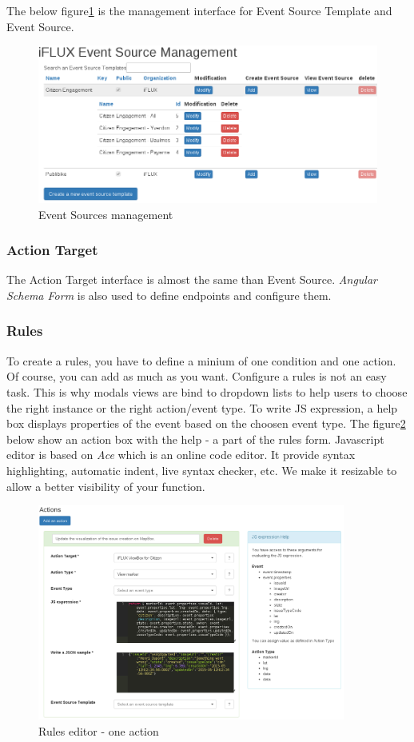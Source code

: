 The below figure\ref{fig:iflux-event-source} is the management interface for Event Source Template and Event Source. 
\begin{figure}
\centering
\includegraphics[width=1\columnwidth]{figures/eventSource.png}
\caption{Event Sources management}
\label{fig:iflux-event-source}
\end{figure}

\subsubsection{Action Target}

The Action Target interface is almost the same than Event Source. \emph{Angular Schema Form} is also used to define endpoints and configure them. 

\subsubsection{Rules}
To create a rules, you have to define a minium of one condition and one action. Of course, you can add as much as you want. Configure a rules is not an easy task. This is why modals views are bind to dropdown lists to help users to choose the right instance or the right action/event type. To write JS expression, a help box displays properties of the event based on the choosen event type. The figure\ref{fig:iflux-rules-action} below show an action box with the help - a part of the rules form. Javascript editor is based on \emph{Ace} which is an online code editor. It provide syntax highlighting, automatic indent, live syntax checker, etc. We make it resizable to allow a better visibility of your function.

\begin{figure}
\centering
\includegraphics[width=0.9\textwidth]{figures/rules-transformation.png}
\caption{Rules editor - one action}
\label{fig:iflux-rules-action}
\end{figure}
